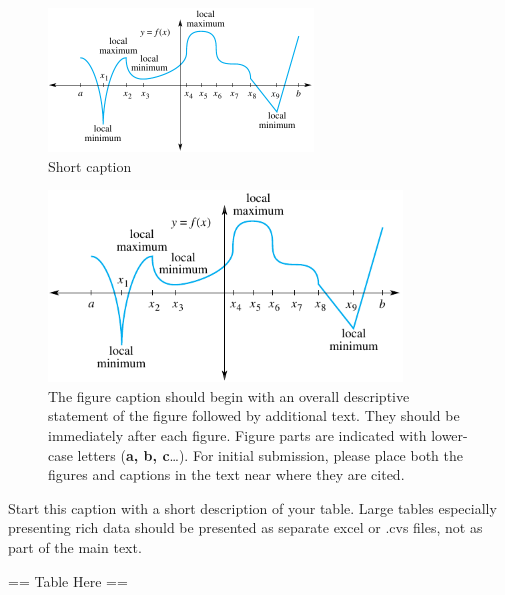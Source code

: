 %
%
%
%

\begin{figure}[ht!]
%
%
\centerline{\includegraphics[height=1.5in]{figsamp}}
\caption{Short caption}
\label{figone}
\end{figure}

\begin{figure}[ht!]
\centerline{\includegraphics[angle=45,height=2in]{figsamp}}
\caption{The figure caption should begin with an overall descriptive
statement of the figure followed by additional text. They should be
immediately after each figure.  Figure parts are indicated with
lower-case letters ({\bf a, b, c}\ldots).  For initial submission, please place
both the figures and captions in the text near where they are cited.}
\label{fig:mean_and_slope}
\end{figure}


\begin{table}
\caption{Start this caption with a short description of your
table.
Large tables
especially presenting rich data should be presented as separate excel
or .cvs files, not as part of the main text.}
== Table Here ==
\end{table}

